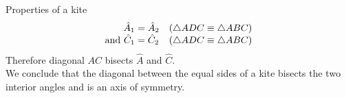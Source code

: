 \begin{wex}{Properties of a kite}
{
\begin{equation*}
  \begin{array}{r@{\;}l@{\quad}l}
    \hat{A}_{1} &= \hat{A}_{2} & \mbox{($\triangle ADC \equiv \triangle ABC$)} \\ 
    \mbox{and } \hat{C}_{1} &= \hat{C}_{2} &  \mbox{($\triangle ADC \equiv \triangle ABC$)}\\ 
  \end{array}
\end{equation*}
Therefore diagonal $AC$ bisects $\hat{A}$ and $\hat{C}$. \\
We conclude that the diagonal between the equal sides of a kite bisects the two interior angles and is an axis of symmetry.
}
\end{wex}

